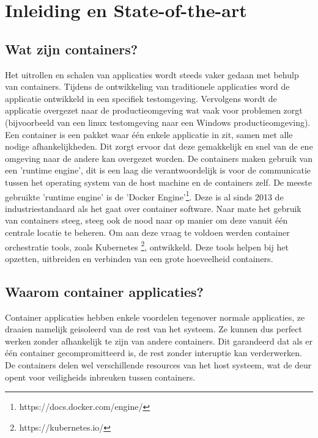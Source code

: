 
\section{Inleiding en State-of-the-art} %
\label{sec:Inleiding en State-of-the-art}

\subsection{Wat zijn containers?}
Het uitrollen en schalen van applicaties wordt steeds vaker gedaan met behulp van containers. 
Tijdens de ontwikkeling van traditionele applicaties word de applicatie ontwikkeld in een specifiek testomgeving. 
Vervolgens wordt de applicatie overgezet naar de productieomgeving wat vaak voor problemen zorgt (bijvoorbeeld van een linux testomgeving naar een Windows productieomgeving).
Een container is een pakket waar één enkele applicatie in zit, samen met alle nodige afhankelijkheden. 
Dit zorgt ervoor dat deze gemakkelijk en snel van de ene omgeving naar de andere kan overgezet worden.
De containers maken gebruik van een 'runtime engine', dit is een laag die verantwoordelijk is voor de communicatie tussen het operating system van de host machine en de containers zelf.
De meeste gebruikte 'runtime engine' is de 'Docker Engine'\footnote{https://docs.docker.com/engine/}. Deze is al sinds 2013 de industriestandaard als het gaat over container software\autocite{McCarty2018}.
Naar mate het gebruik van containers steeg, steeg ook de nood naar op manier om deze vanuit één centrale locatie te beheren.
Om aan deze vraag te voldoen werden container orchestratie tools, zoals Kubernetes \footnote{https://kubernetes.io/}, ontwikkeld. 
Deze tools helpen bij het opzetten, uitbreiden en verbinden van een grote hoeveelheid containers.

\subsection{Waarom container applicaties?}
Container applicaties hebben enkele voordelen tegenover normale applicaties, ze draaien namelijk geisoleerd van de rest van het systeem. 
Ze kunnen dus perfect werken zonder afhankelijk te zijn van andere containers.
Dit garandeerd dat als er één container gecompromitteerd is, de rest zonder interuptie kan verderwerken.
De containers delen wel verschillende resources van het host systeem, wat de deur opent voor veiligheids inbreuken tussen containers.

